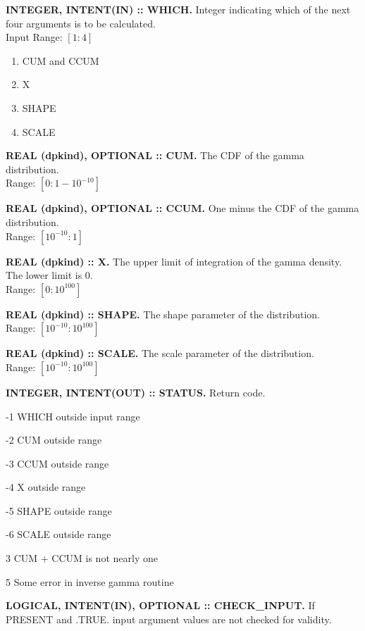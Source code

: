 \documentclass[12pt,dvips]{article}
\newcommand{\range}[2]{\hfill Range: \ensuremath{\left[ #1:#2
\right]}\\}
\newcommand{\inrange}[2]{\hfill Input Range: \ensuremath{\left[ #1:#2
\right]}\\}
\newcommand{\sprob}{10^{-10}}
\newcommand{\bprob}{1-\sprob}
\newcommand{\immense}{10^{100}}
\newcommand{\myitem}[1]{\item{\bf \color{Violet} #1 \normalcolor}}
\begin{document}
\begin{description}

\myitem{INTEGER, INTENT(IN)  :: WHICH.} Integer indicating  which of the
next four arguments is to be calculated.\\
\inrange{1}{4}
\begin{enumerate}
\item CUM and CCUM
\item X
\item SHAPE
\item SCALE
\end{enumerate}

\myitem{REAL (dpkind), OPTIONAL :: CUM.} The CDF of the gamma distribution.\\
\range{0}{\bprob}

\myitem{REAL (dpkind), OPTIONAL :: CCUM.} One minus the CDF of the
gamma distribution.\\
\range{\sprob}{1}

\myitem{REAL (dpkind) :: X.}  The upper limit of integration of
the gamma density.  The lower limit is 0.\\
\range{0}{\immense}

\myitem{REAL (dpkind) :: SHAPE.}  The shape parameter of the
distribution.\\
\range{\sprob}{\immense}

\myitem{REAL (dpkind) :: SCALE.}  The scale parameter of the distribution.\\
\range{\sprob}{\immense}

\myitem{INTEGER, INTENT(OUT) :: STATUS.} Return code.
\begin{description}
\item{-1}  WHICH outside input range
\item{-2}  CUM outside range
\item{-3}  CCUM outside range
\item{-4}  X outside range
\item{-5}  SHAPE outside range
\item{-6}  SCALE outside range
\item{3} CUM + CCUM is not nearly one
\item{5} Some error in inverse gamma routine
\end{description}

\myitem{LOGICAL, INTENT(IN), OPTIONAL :: CHECK\_INPUT.}  If PRESENT
and .TRUE. input argument values are not checked for validity.

\end{description}
\end{document}
